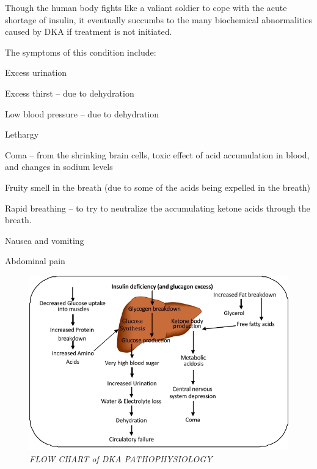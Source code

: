 Though the human body fights like a valiant soldier to cope with the acute shortage of insulin, it eventually succumbs to the many biochemical abnormalities caused by DKA if treatment is not initiated.

The symptoms of this condition include:

\item Excess urination

 \item Excess thirst – due to dehydration

 \item Low blood pressure – due to dehydration

 \item Lethargy

 \item Coma – from the shrinking brain cells, toxic effect of acid accumulation in blood, and changes in sodium levels

 \item Fruity smell in the breath (due to some of the acids being expelled in the breath)

 \item Rapid breathing – to try to neutralize the accumulating ketone acids through the breath.

 \item Nausea and vomiting

 \item Abdominal pain


\begin{figure}
\caption{\textit{FLOW CHART of DKA PATHOPHYSIOLOGY}}
\includegraphics{images/038.jpg}
\end{figure}

